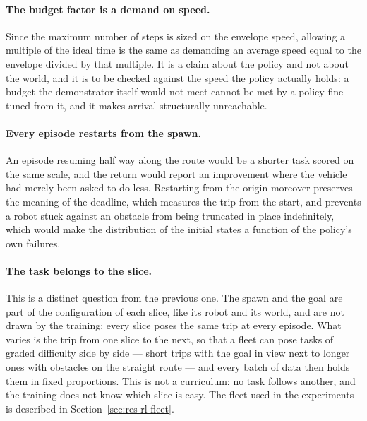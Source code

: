 \paragraph{The budget factor is a demand on speed.}
Since the maximum number of steps is sized on the envelope speed, allowing a
multiple of the ideal time is the same as demanding an average speed equal to
the envelope divided by that multiple. It is a claim about the policy and not
about the world, and it is to be checked against the speed the policy actually
holds: a budget the demonstrator itself would not meet cannot be met by a policy
fine-tuned from it, and it makes arrival structurally unreachable.

\paragraph{Every episode restarts from the spawn.}
An episode resuming half way along the route would be a shorter task scored on
the same scale, and the return would report an improvement where the vehicle had
merely been asked to do less. Restarting from the origin moreover preserves the
meaning of the deadline, which measures the trip from the start, and prevents a
robot stuck against an obstacle from being truncated in place indefinitely,
which would make the distribution of the initial states a function of the
policy's own failures.

\paragraph{The task belongs to the slice.}
This is a distinct question from the previous one. The spawn and the goal are
part of the configuration of each slice, like its robot and its world, and are
not drawn by the training: every slice poses the same trip at every episode.
What varies is the trip from one slice to the next, so that a fleet can pose
tasks of graded difficulty side by side --- short trips with the goal in view
next to longer ones with obstacles on the straight route --- and every batch of
data then holds them in fixed proportions. This is not a curriculum: no task
follows another, and the training does not know which slice is easy. The
fleet used in the experiments is described in Section~\ref{sec:res-rl-fleet}.

